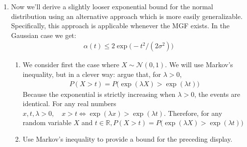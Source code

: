 \documentclass[10pt]{article}
\begin{document}
\begin{enumerate}[label=(\roman*)]
\begin{enumerate}[label=(\alph*)]
        We use the substitution $x = t + y $ (so $dx = dy $) to get 
        \begin{gather*}
            \alpha(t) = \frac{2}{\sqrt{2\pi}}\int_{0}^{\infty}\exp\big(-(t + y)^2 / 2\big) dy = \\
            \frac{2}{\sqrt{2\pi}}\exp(-t^2 / 2)\int_{0}^{\infty}\exp(-ty-y^2 / 2) dy \le \frac{2}{\sqrt{2\pi}}\exp(-t^2 / 2) \int_{0}^{\infty}\exp(-ty) dy = \\
            \frac{2}{\sqrt{2\pi}}\exp(-t^2 / 2)\cdot \frac{1}{t},\quad t > 0
        \end{gather*}
        Thus, for $X \sim \mathcal{N}(0, 1)$,
        \begin{gather*}
            \alpha(t) \le \frac{2}{t\sqrt{2\pi}}\exp(-t^2 / 2)
        \end{gather*}
        \newpage
        \item For the general case $X \sim \mathcal{N}(\mu, \sigma^2)$, let $Z = (X - \mu) / \sigma \sim \mathcal{N}(0, 1)$. Then 
        \begin{gather*}
            \alpha(t) = P(|X - \mu| > t) = P(|Z| > t / \sigma) \le \frac{2}{(t / \sigma)\sqrt{2\pi}}\exp\left(-\frac{(t / \sigma)^2}{2}\right) = \frac{\sigma}{t}\frac{2}{\sqrt{2\pi}}\exp\left(-\frac{t^2}{2\sigma^2}\right)
        \end{gather*}
        Comparison with part $(i)$: The bound in $(i)$ decays polynomially as $t^{-p}$, while the Gaussian bound decays exponentially in $t^2 $, which is dramatically sharper for large $t $.
    \end{enumerate}
    \item Now we'll derive a slightly looser exponential bound for the normal distribution using an alternative approach which is more easily generalizable. Specifically, this approach is applicable whenever the MGF exists. In the Gaussian case we get:
    \begin{gather}
        \alpha(t) \le 2 \exp\big(-t^2 / (2\sigma^2)\big)
    \end{gather}
    \begin{enumerate}[label=(\alph*)]
        \item We consider first the case where $X \sim \mathcal{N}(0, 1)$. We will use Markov's inequality, but in a clever way: argue that, for $\lambda > 0 $,
        \begin{gather*}
            P(X > t) = P\big(\exp(\lambda X) > \exp(\lambda t)\big)
        \end{gather*}
        Because the exponential is strictly increasing when $\lambda > 0 $, the events are identical. For any real numbers $x, t, \lambda > 0, \quad x > t \iff \exp(\lambda x) > \exp(\lambda t)$. Therefore, for any random variable $X $ and $t \in \mathbb{R}, P(X > t) = P\big(\exp(\lambda X) > \exp(\lambda t)\big)$
        \\
        \item Use Markov's inequality to provide a bound for the preceding display.
        

\end{enumerate}
\end{enumerate}
\end{document}
